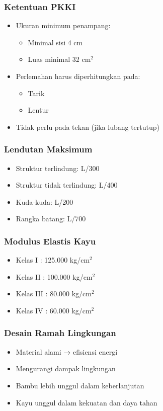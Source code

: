 \documentclass[../main.tex]{subfiles}
\begin{document}
\begin{frame}[mytitle=standard,t,mycolor=digiPH_uniblue,light]\frametitle{Ketentuan PKKI}
	\begin{itemize}
		\item Ukuran minimum penampang:
		      \begin{itemize}
			      \item Minimal sisi 4 cm
			      \item Luas minimal 32 cm$^2$
		      \end{itemize}
		\item Perlemahan harus diperhitungkan pada:
		      \begin{itemize}
			      \item Tarik
			      \item Lentur
		      \end{itemize}
		\item Tidak perlu pada tekan (jika lubang tertutup)
	\end{itemize}\end{frame}

\begin{frame}[mytitle=standard,t,mybg=bglight3,light]\frametitle{Lendutan Maksimum}
	\begin{itemize}
		\item Struktur terlindung: L/300
		\item Struktur tidak terlindung: L/400
		\item Kuda-kuda: L/200
		\item Rangka batang: L/700
	\end{itemize}\end{frame}

\begin{frame}[mytitle=standard,t,mycolor=digiPH_white,light]\frametitle{Modulus Elastis Kayu}
	\begin{center}
		\begin{itemize}
			\item Kelas I : 125.000 kg/cm$^2$
			\item Kelas II : 100.000 kg/cm$^2$
			\item Kelas III : 80.000 kg/cm$^2$
			\item Kelas IV : 60.000 kg/cm$^2$
		\end{itemize}
	\end{center}
\end{frame}

\begin{frame}[mytitle=standard,c,mybg=bglight2,light]\frametitle{Desain Ramah Lingkungan}
	\begin{itemize}
		\item Material alami → efisiensi energi
		\item Mengurangi dampak lingkungan
		\item Bambu lebih unggul dalam keberlanjutan
		\item Kayu unggul dalam kekuatan dan daya tahan
	\end{itemize}\end{frame}
\end{document}
